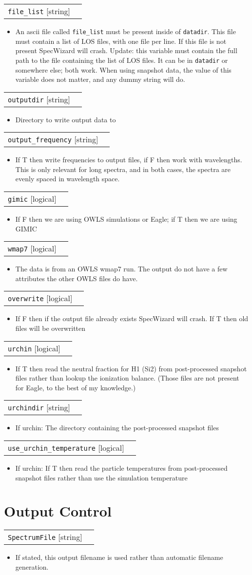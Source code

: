 \documentclass{report}
\makeatletter
\newcommand{\paramdefinition}[3]{
\begin{tabular*}{\textwidth}{l@{\extracolsep{\fill}}r}
		{\tt #1} [{\sc #2}]& #3 \\
\end{tabular*}}
\newcommand{\paramdescription}[1]{
\begin{itemize}
\item #1
\end{itemize}\vspace{0.2cm}}
\newcommand{\param}[1]{{\tt #1}}
\makeatother
\begin{document}
\paramdefinition{file\_list}{string}{}
\paramdescription{An ascii file called {\tt file\_list} must be present inside of {\tt datadir}.  This file must contain a list of LOS files, with one file per line.  If this file is not present SpecWizard will crash. Update: this variable must contain the full path to the file containing the list of LOS files. It can be in \param{datadir} or somewhere else; both work. When using snapshot data, the value of this variable does not matter, and any dummy string will do.}

\paramdefinition{outputdir}{string}{}
\paramdescription{Directory to write output data to}

\paramdefinition{output\_frequency}{string}{}
\paramdescription{If T then write frequencies to output files, if F then work with wavelengths. This is only relevant for long spectra, and in both cases, the spectra are evenly spaced in wavelength space.}

\paramdefinition{gimic}{logical}{}
\paramdescription{If F then we are using OWLS simulations or Eagle; if T then we are using GIMIC}

\paramdefinition{wmap7}{logical}{}
\paramdescription{The data is from an OWLS wmap7 run. The output do not have a few attributes the other OWLS files do have.}

\paramdefinition{overwrite}{logical}{}
\paramdescription{If F then if the output file already exists SpecWizard will crash.  If T then old files will be overwritten}

\paramdefinition{urchin}{logical}{}
\paramdescription{If T then read the neutral fraction for H1 (Si2) from post-processed snapshot files rather than lookup the ionization balance. (Those files are not present for Eagle, to the best of my knowledge.)}

\paramdefinition{urchindir}{string}{}
\paramdescription{If urchin: The directory containing the post-processed snapshot files}

\paramdefinition{use\_urchin\_temperature}{logical}{}
\paramdescription{If urchin: If T then read the particle temperatures from post-processed snapshot files rather than use the simulation temperature}



\section{Output Control}

\paramdefinition{SpectrumFile}{string}{}
\paramdescription{If stated, this output filename is used rather than automatic filename generation.}
\end{document}
